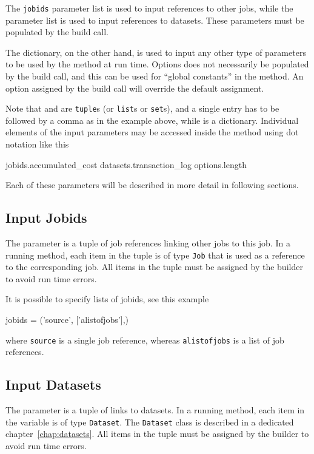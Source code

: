 The \texttt{jobids} parameter list is used to input references to
other jobs, while the \datasets parameter list is used to input
references to datasets.  These parameters must be populated by the
build call.

The \options dictionary, on the other hand, is used to input any other
type of parameters to be used by the method at run time.  Options does
not necessarily be populated by the build call, and this can be used
for ``global constants'' in the method.  An option assigned by the
build call will override the default assignment.

Note that \jobids and \datasets are \texttt{tuple}s (or \texttt{list}s
or \texttt{set}s), and a single entry has to be followed by a comma as
in the example above, while \options is a dictionary.  Individual
elements of the input parameters may be accessed inside the method
using dot notation like this
\begin{python}
jobids.accumulated_cost
datasets.transaction_log
options.length
\end{python}
Each of these parameters will be described in more detail in following
sections.


\subsection*{Input Jobids}
The \jobids parameter is a tuple of job references linking other jobs
to this job.  In a running method, each item in the \jobids tuple is
of type \texttt{Job} that is used as a reference to the corresponding
job.  All items in the \jobids tuple must be assigned by the builder
to avoid run time errors.

It is possible to specify lists of jobids, see this example
\begin{python}
jobids = ('source', ['alistofjobs'],)
\end{python}
where \texttt{source} is a single job reference, whereas
\texttt{alistofjobs} is a list of job references.


\subsection*{Input Datasets}
The \datasets parameter is a tuple of links to datasets.  In a running
method, each item in the \datasets variable is of type
\texttt{Dataset}.  The \texttt{Dataset} class is described in a
dedicated chapter~\ref{chap:datasets}.  All items in the \datasets
tuple must be assigned by the builder to avoid run time errors.

